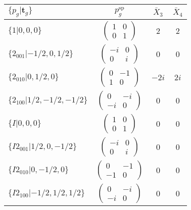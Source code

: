 \documentclass[3p,preprint]{elsarticle}
\newcommand{\bt}{\bm{t}}
\begin{document}
\begin{table}[H]
	\begin{tabular}{|l|c||c|c|}\hline
			$\{p_g|\bt_g\}$ & $p_g^{\text{sp}}$ & $\bar{X}_3$ & $\bar{X}_4$  \\ \hline \hline
			$\{1|0,0,0\}$ & 					$\left(\begin{array}{cc} 1&0 \\ 0&1 \end{array}\right)$	& $2$ &  $2$ \\ \hline
			$\{2_{001}|-1/2,0,1/2\}$ &		$\left(\begin{array}{cc} -i&0 \\ 0&i \end{array}\right)$	& $0$ & $0$  \\ \hline
			$\{2_{010}|0,1/2,0\}$ &			$\left(\begin{array}{cc} 0&-1 \\ 1&0 \end{array}\right)$	& $-2i$ & $2i$\\ \hline
			$\{2_{100}|1/2,-1/2,-1/2\}$ &		$\left(\begin{array}{cc} 0&-i \\ -i&0 \end{array}\right)$	& $0$ & $0$\\ \hline
			$\{I|0,0,0\}$ & 						$\left(\begin{array}{cc} 1&0 \\ 0&1 \end{array}\right)$	& $0$ &  $0$\\ \hline
			$\{I2_{001}|1/2,0,-1/2\}$ &		$\left(\begin{array}{cc} -i&0 \\ 0&i \end{array}\right)$	& $0$ & $0$  \\ \hline
			$\{I2_{010}|0,-1/2,0\}$ &			$\left(\begin{array}{cc} 0&-1 \\ -1&0 \end{array}\right)$	& $0$ & $0$\\ \hline
			$\{I2_{100}|-1/2,1/2,1/2\}$ &		$\left(\begin{array}{cc} 0&-i \\ -i&0 \end{array}\right)$	& $0$ & $0$\\ \hline
	\end{tabular}
\end{table}
\end{document}
